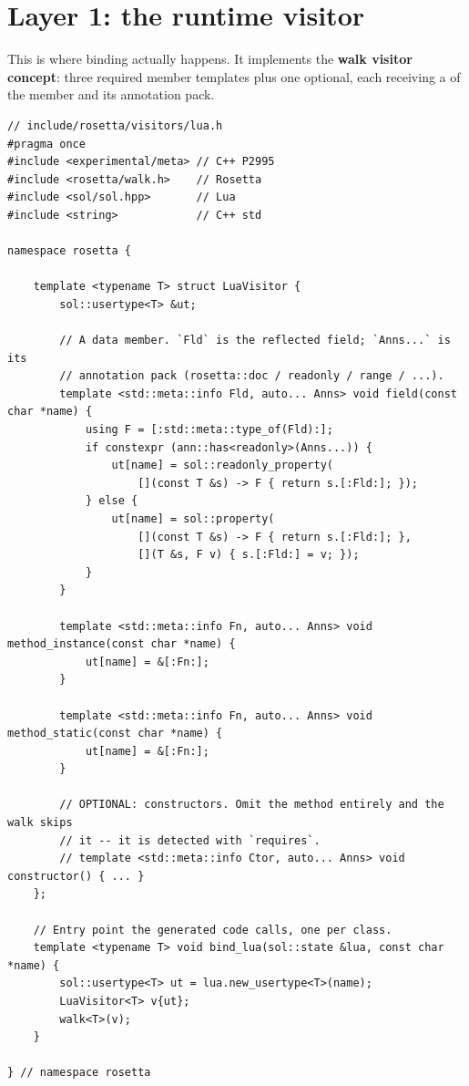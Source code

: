 \section{Layer 1: the runtime visitor}

This is where binding actually happens. It implements the \textbf{walk visitor
concept}: three required member templates plus one optional, each receiving a
 of the member and its annotation pack.

\begin{lstlisting}[style=cpp]
// include/rosetta/visitors/lua.h
#pragma once
#include <experimental/meta> // C++ P2995
#include <rosetta/walk.h>    // Rosetta
#include <sol/sol.hpp>       // Lua
#include <string>            // C++ std

namespace rosetta {

    template <typename T> struct LuaVisitor {
        sol::usertype<T> &ut;

        // A data member. `Fld` is the reflected field; `Anns...` is its
        // annotation pack (rosetta::doc / readonly / range / ...).
        template <std::meta::info Fld, auto... Anns> void field(const char *name) {
            using F = [:std::meta::type_of(Fld):];
            if constexpr (ann::has<readonly>(Anns...)) {
                ut[name] = sol::readonly_property(
                    [](const T &s) -> F { return s.[:Fld:]; });
            } else {
                ut[name] = sol::property(
                    [](const T &s) -> F { return s.[:Fld:]; },
                    [](T &s, F v) { s.[:Fld:] = v; });
            }
        }

        template <std::meta::info Fn, auto... Anns> void method_instance(const char *name) {
            ut[name] = &[:Fn:];
        }

        template <std::meta::info Fn, auto... Anns> void method_static(const char *name) {
            ut[name] = &[:Fn:];
        }

        // OPTIONAL: constructors. Omit the method entirely and the walk skips
        // it -- it is detected with `requires`.
        // template <std::meta::info Ctor, auto... Anns> void constructor() { ... }
    };

    // Entry point the generated code calls, one per class.
    template <typename T> void bind_lua(sol::state &lua, const char *name) {
        sol::usertype<T> ut = lua.new_usertype<T>(name);
        LuaVisitor<T> v{ut};
        walk<T>(v);
    }

} // namespace rosetta
\end{lstlisting}

